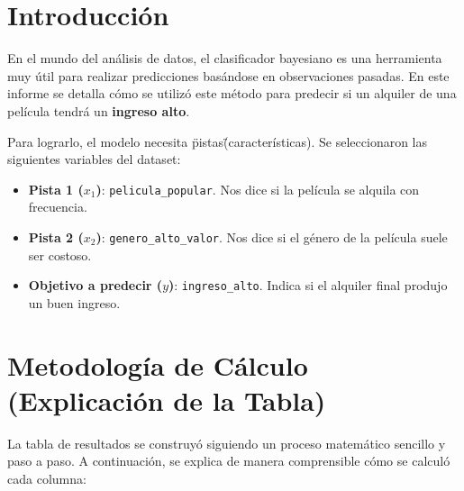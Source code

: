 \documentclass[12pt,a4paper]{article}
\begin{document}
\section{Introducci\'on}
En el mundo del an\'alisis de datos, el clasificador bayesiano es una herramienta muy \'util para realizar predicciones bas\'andose en observaciones pasadas. En este informe se detalla c\'omo se utiliz\'o este m\'etodo para predecir si un alquiler de una pel\'icula tendr\'a un \textbf{ingreso alto}.

Para lograrlo, el modelo necesita \"pistas\" (caracter\'isticas). Se seleccionaron las siguientes variables del dataset:
\begin{itemize}
  \item \textbf{Pista 1 ($x_1$)}: \texttt{pelicula\_popular}. Nos dice si la pel\'icula se alquila con frecuencia.
  \item \textbf{Pista 2 ($x_2$)}: \texttt{genero\_alto\_valor}. Nos dice si el g\'enero de la pel\'icula suele ser costoso.
  \item \textbf{Objetivo a predecir ($y$)}: \texttt{ingreso\_alto}. Indica si el alquiler final produjo un buen ingreso.
\end{itemize}

\section{Metodolog\'ia de C\'alculo (Explicaci\'on de la Tabla)}
La tabla de resultados se construy\'o siguiendo un proceso matem\'atico sencillo y paso a paso. A continuaci\'on, se explica de manera comprensible c\'omo se calcul\'o cada columna:
\end{document}
